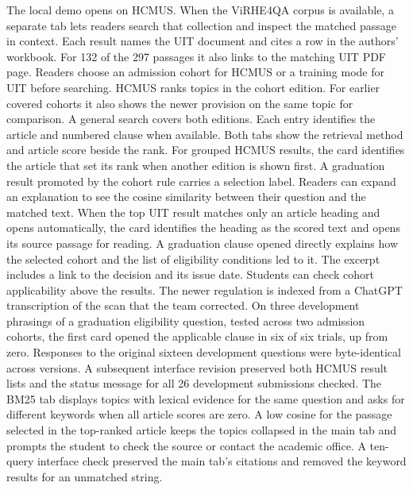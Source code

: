 The local demo opens on HCMUS. When the ViRHE4QA corpus is available,
a separate tab lets readers search that collection and inspect the
matched passage in context. Each result names the UIT document and cites
a row in the authors' workbook. For 132 of the 297 passages it also links to the matching UIT PDF page.
Readers choose an admission cohort for HCMUS or a training mode for UIT before searching.
HCMUS ranks topics in the cohort edition. For earlier covered cohorts it also
shows the newer provision on the same topic for comparison. A general search covers both editions. %
Each entry identifies the article and numbered clause when available.
Both tabs show the retrieval method and article score beside the rank.
For grouped HCMUS results, the card identifies the article that set its rank
when another edition is shown first. A graduation result promoted by the
cohort rule carries a selection label.
Readers can expand an explanation to see the cosine similarity between their
question and the matched text. When the top UIT result matches only an article
heading and opens automatically, the card identifies the heading as the scored
text and opens its source passage for reading. A graduation clause opened directly
explains how the selected cohort and the list of eligibility conditions led to it.
The excerpt includes a link to the decision and its issue date. Students can check cohort applicability above the results. The newer regulation is indexed
from a ChatGPT transcription of the scan that the team corrected.
On three development phrasings of a graduation eligibility question, tested
across two admission cohorts, the first card opened the applicable clause in
six of six trials, up from zero. Responses to the original sixteen development
questions were byte-identical across versions.
A subsequent interface revision preserved both HCMUS result lists and the
status message for all 26 development submissions checked.
The BM25 tab displays topics with lexical evidence for the same question
and asks for different keywords when all article scores are zero. A low cosine for the passage selected
in the top-ranked article keeps the topics collapsed in the main tab
and prompts the student to check the source or contact the academic office.
A ten-query interface check preserved the main tab's citations and removed
the keyword results for an unmatched string. %

